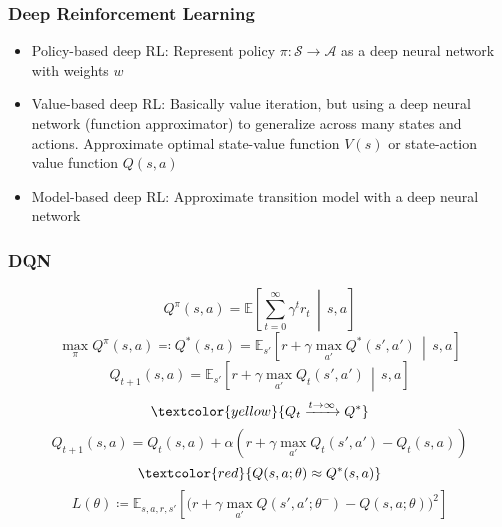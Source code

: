 \documentclass[UTF8,11pt,colorlinks,compress,openany]{beamer}%
\begin{document}
\begin{frame}\frametitle{Deep Reinforcement Learning}
\begin{itemize}
	\item Policy-based deep RL: Represent policy $\pi: \mathcal{S}\to\mathcal{A}$ as a deep neural network with weights $w$
	\item Value-based deep RL: Basically value iteration, but using a deep neural network (function approximator) to generalize across many states and actions. Approximate optimal state-value function $V(s)$ or state-action value function $Q(s,a)$
	\item Model-based deep RL: Approximate transition model with a deep neural network
\end{itemize}\vspace*{-2ex}
\begin{figure}[H]
\centering
{}
\end{figure}
\end{frame}

\begin{frame}\frametitle{DQN}
	\[Q^\pi(s,a)=\mathbb{E}\left[\sum\limits_{t=0}^\infty\gamma^tr_t\,\middle|\, s,a\right]\]
	\[\max_\pi Q^\pi(s,a)\eqqcolon Q^*(s,a)=\mathbb{E}_{s'}\left[r+\gamma\max_{a'}Q^*(s',a')\,\middle|\, s,a\right]\]
	\[Q_{t+1}(s,a)=\mathbb{E}_{s'}\left[r+\gamma\max_{a'}Q_t(s',a')\,\middle|\, s,a\right]\]
	\[\textcolor{yellow}{Q_t\xrightarrow{t\to\infty}Q^*}\]
	\[Q_{t+1}(s,a)=Q_t(s,a)+\alpha\left(r+\gamma\max\limits_{a'} Q_t(s',a')-Q_t(s,a)\right)\]
	\[\textcolor{red}{Q(s,a;\theta)\approx Q^*(s,a)}\]
	\[L(\theta)\coloneqq \mathbb{E}_{s,a,r,s'}\left[\Big(r+\gamma\max\limits_{a'} Q\left(s',a';\theta^-\right)-Q(s,a;\theta)\Big)^2\right]\tag{DQN}\]
\end{frame}
\end{document}
